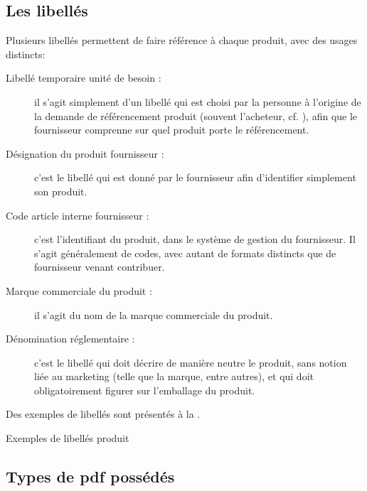             \subsection{Les libellés}
            \label{libelles}

            Plusieurs libellés permettent de faire référence à chaque produit, avec des usages distincts:
            \begin{description}
                \item[Libellé temporaire unité de besoin :] il s'agit simplement d'un libellé qui est choisi par la personne à l'origine de la demande de référencement produit (souvent l'acheteur, cf. ), afin que le fournisseur comprenne sur quel produit porte le référencement.
                \item[Désignation du produit fournisseur :] c'est le libellé qui est donné par le fournisseur afin d'identifier simplement son produit.
                \item[Code article interne fournisseur :] c'est l'identifiant du produit, dans le système de gestion du fournisseur. Il s'agit généralement de codes, avec autant de formats distincts que de fournisseur venant contribuer.
                \item[Marque commerciale du produit :] il s'agit du nom de la marque commerciale du produit. 
                \item[Dénomination réglementaire :] c'est le libellé qui doit décrire de manière neutre le produit, sans notion liée au marketing (telle que la marque, entre autres), et qui doit obligatoirement figurer sur l'emballage du produit.
                \end{description}

            Des exemples de libellés sont présentés à la .

            {\renewcommand{\arraystretch}{2}%
            \begin{table}[htbp]
                {\scriptsize
                \begin{center}%
                \caption{Exemples de libellés produit}%
                \label{tbl:exemple_lib}%
                \end{center}%
                }
            \end{table}
            }

            \subsection{Types de pdf possédés}

